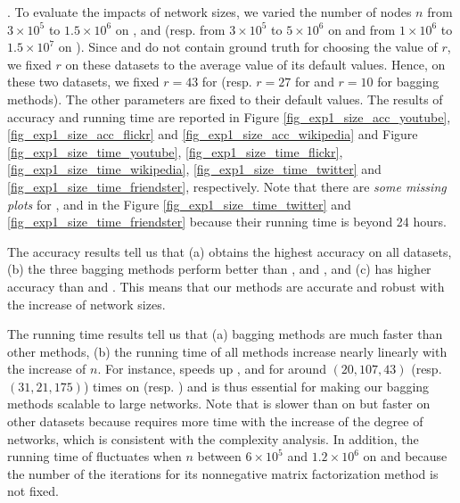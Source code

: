 . To evaluate the impacts of network sizes, we varied the
number of nodes $n$ from $3\times 10^5$ to $1.5\times 10^6$ on \YouTube, \Flickr and \Wikipedia (resp.
from $3\times 10^5$ to $5\times 10^6$ on \Twitter and from $1\times 10^6$ to $1.5\times 10^7$ on
\Friendster). Since \Twitter and \Friendster do not contain
ground truth for choosing the value of $r$, we fixed $r$ on these datasets to the average value of
its default values. Hence, on these two datasets, we fixed $r = 43$ for \NMF
(resp. $r = 27$ for \BIGCLAM and $r = 10$ for bagging methods).
The other parameters are fixed to their default values.
The results of accuracy and running time are reported in Figure \ref{fig_exp1_size_acc_youtube},
\ref{fig_exp1_size_acc_flickr} and \ref{fig_exp1_size_acc_wikipedia} and Figure \ref{fig_exp1_size_time_youtube},
\ref{fig_exp1_size_time_flickr}, \ref{fig_exp1_size_time_wikipedia}, \ref{fig_exp1_size_time_twitter} and
\ref{fig_exp1_size_time_friendster}, respectively. Note that there are {\em some missing plots} for \NMF, \Aa and
\BIGCLAM in the Figure \ref{fig_exp1_size_time_twitter} and
\ref{fig_exp1_size_time_friendster} because their running time
is beyond 24 hours.



The accuracy results tell us that (a) \Biased obtains the highest accuracy on all
datasets, (b) the three bagging methods perform better than \NMF, \Aa and \BIGCLAM,
and (c) \NMF has higher accuracy than \Aa and \BIGCLAM. This means that
our methods are accurate and robust with the increase of network sizes.

The running time results tell us that (a) bagging methods are much faster than other methods,
(b) the running time of all methods increase nearly linearly with the increase of $n$. For
instance, \Biased speeds up \NMF, \Aa and \BIGCLAM for around $(20, 107, 43)$ (resp. $(31, 21, 175)$)
times on \Twitter (resp. \Friendster) and is thus essential for
making our bagging methods scalable to large networks. Note
that \NMF is slower than \BIGCLAM on \YouTube but faster on other datasets
because \BIGCLAM requires more time with the increase of the degree of networks,
which is consistent with the complexity analysis.
In addition, the running time of \BIGCLAM fluctuates when
$n$ between $6\times 10^5$ and $1.2\times 10^6$ on \YouTube and \Flickr because the number of
the iterations for its nonnegative matrix factorization method is not fixed.


